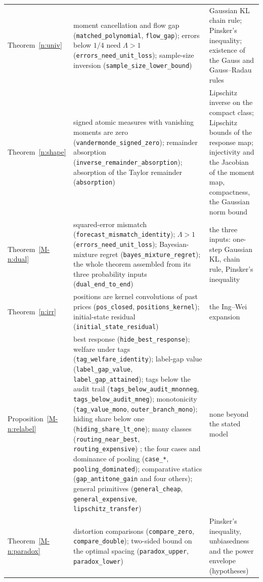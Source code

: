 \documentclass[12pt]{article}
\theoremstyle{definition}
\theoremstyle{remark}
\begin{document}
{\begin{longtable}{>{\raggedright\arraybackslash}p{}>{\raggedright\arraybackslash}p{}>{\raggedright\arraybackslash}p{}}
Theorem~\ref{n:univ} & moment cancellation and flow gap (\texttt{matched\_polynomial}, \texttt{flow\_gap}); errors below $1/4$ need $\Lambda>1$ (\texttt{errors\_need\_unit\_loss}); sample-size inversion (\texttt{sample\_size\_lower\_bound}) & Gaussian KL chain rule; Pinsker's inequality; existence of the Gauss and Gauss--Radau rules\\
Theorem~\ref{n:shape} & signed atomic measures with vanishing moments are zero (\texttt{vandermonde\_signed\_zero}); remainder absorption (\texttt{inverse\_remainder\_absorption}); absorption of the Taylor remainder (\nolinkurl{absorption}) & Lipschitz inverse on the compact class; Lipschitz bounds of the response map; injectivity and the Jacobian of the moment map, compactness, the Gaussian norm bound\\
Theorem~\ref{M-n:dual} & squared-error mismatch (\texttt{forecast\_mismatch\_identity}); $\Lambda>1$ (\texttt{errors\_need\_unit\_loss}); Bayesian-mixture regret (\texttt{bayes\_mixture\_regret}); the whole theorem assembled from its three probability inputs (\texttt{dual\_end\_to\_end}) & the three inputs: one-step Gaussian KL, chain rule, Pinsker's inequality\\
Theorem~\ref{n:irr} & positions are kernel convolutions of past prices (\texttt{pos\_closed}, \texttt{positions\_kernel}); initial-state residual (\texttt{initial\_state\_residual}) & the Ing--Wei expansion\\
Proposition~\ref{M-n:relabel} & best response (\texttt{hide\_best\_response}); welfare under tags (\texttt{tag\_welfare\_identity}); label-gap value (\texttt{label\_gap\_value}, \texttt{label\_gap\_attained}); tags below the audit trail (\texttt{tags\_below\_audit\_mnonneg}, \texttt{tags\_below\_audit\_mneg}); monotonicity (\texttt{tag\_value\_mono}, \texttt{outer\_branch\_mono}); hiding share below one (\texttt{hiding\_share\_lt\_one}); many classes (\texttt{routing\_near\_best}, \texttt{routing\_expensive}) ; the four cases and dominance of pooling (\texttt{case\_*}, \texttt{pooling\_dominated}); comparative statics (\texttt{gap\_antitone\_gain} and four others); general primitives (\texttt{general\_cheap}, \texttt{general\_expensive}, \texttt{lipschitz\_transfer}) & none beyond the stated model\\
Theorem~\ref{M-n:paradox} & distortion comparisons (\texttt{compare\_zero}, \texttt{compare\_double}); two-sided bound on the optimal spacing (\texttt{paradox\_upper}, \texttt{paradox\_lower}) & Pinsker's inequality, unbiasedness and the power envelope (hypotheses)\\

\end{longtable}}
\end{document}
